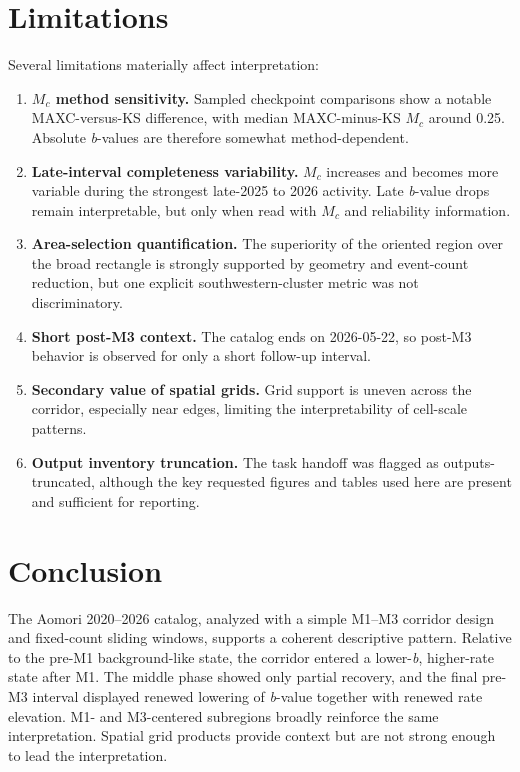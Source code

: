 \documentclass[11pt]{article}
\begin{document}
\section{Limitations}
Several limitations materially affect interpretation:
\begin{enumerate}
    \item \textbf{$M_c$ method sensitivity.} Sampled checkpoint comparisons show a notable MAXC-versus-KS difference, with median MAXC-minus-KS $M_c$ around 0.25. Absolute \textit{b}-values are therefore somewhat method-dependent.
    \item \textbf{Late-interval completeness variability.} $M_c$ increases and becomes more variable during the strongest late-2025 to 2026 activity. Late \textit{b}-value drops remain interpretable, but only when read with $M_c$ and reliability information.
    \item \textbf{Area-selection quantification.} The superiority of the oriented region over the broad rectangle is strongly supported by geometry and event-count reduction, but one explicit southwestern-cluster metric was not discriminatory.
    \item \textbf{Short post-M3 context.} The catalog ends on 2026-05-22, so post-M3 behavior is observed for only a short follow-up interval.
    \item \textbf{Secondary value of spatial grids.} Grid support is uneven across the corridor, especially near edges, limiting the interpretability of cell-scale patterns.
    \item \textbf{Output inventory truncation.} The task handoff was flagged as outputs-truncated, although the key requested figures and tables used here are present and sufficient for reporting.
\end{enumerate}

\section{Conclusion}
The Aomori 2020--2026 catalog, analyzed with a simple M1--M3 corridor design and fixed-count sliding windows, supports a coherent descriptive pattern. Relative to the pre-M1 background-like state, the corridor entered a lower-\textit{b}, higher-rate state after M1. The middle phase showed only partial recovery, and the final pre-M3 interval displayed renewed lowering of \textit{b}-value together with renewed rate elevation. M1- and M3-centered subregions broadly reinforce the same interpretation. Spatial grid products provide context but are not strong enough to lead the interpretation.
\end{document}
